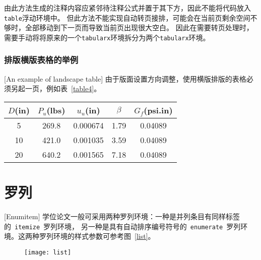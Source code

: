 由此方法生成的注释内容应紧邻待注释公式并置于其下方，因此不能将代码放入\verb|table|浮动环境中。
但此方法不能实现自动转页接排，可能会在当前页剩余空间不够时，全部移动到下一页而导致当前页出现很大空白。
因此在需要转页处理时，需要手动将将原来的一个\verb|tabularx|环境拆分为两个\verb|tabularx|环境。

\subsubsection{排版横版表格的举例}[An example of landscape table]
由于版面设置方向调整，使用横版排版的表格必须另起一页，例如表~\ref{table4}。

\begin{table}[p]
  \centering
  \begin{sideways}
    \begin{minipage}{\textheight}
      \vspace{0.5em}\centering\wuhao
      \begin{tabular}{ccccc}
        \toprule[1.5pt]
        $D$(in) & $P_u$(lbs) & $u_u$(in) & $\beta$ & $G_f$(psi.in) \\
        \midrule[1pt]
        5       & 269.8      & 0.000674  & 1.79    & 0.04089       \\
        10      & 421.0      & 0.001035  & 3.59    & 0.04089       \\
        20      & 640.2      & 0.001565  & 7.18    & 0.04089       \\
        \bottomrule[1.5pt]
      \end{tabular}
    \end{minipage}
  \end{sideways}
\end{table}

\section{罗列}[Enumitem]
学位论文一般可采用两种罗列环境：一种是并列条目有同样标签的~\verb|itemize|~罗列环境，
另一种是具有自动排序编号符号的~\verb|enumerate|~罗列环境。这两种罗列环境的样式参数可参考图~\ref{list}。
\begin{figure}[htbp]
  \centering
  \texttt{[image: list]}
  \vspace{-1em}
\end{figure}

